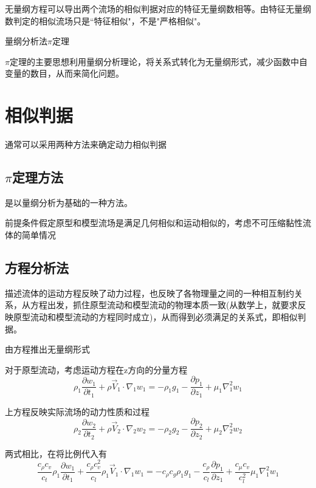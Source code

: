 \documentclass[a4paper,oneside]{ctexbook}
\begin{document}
无量纲方程可以导出两个流场的相似判据对应的特征无量纲数相等。由特征无量纲数判定的相似流场只是“特征相似"，不是"严格相似"。

量纲分析法\(\pi\)定理

\(\pi\)定理的主要思想利用量纲分析理论，将关系式转化为无量纲形式，减少函数中自变量的数目，从而来简化问题。

\section{相似判据}

通常可以采用两种方法来确定动力相似判据

\subsection{\(\pi\)定理方法}

是以量纲分析为基础的一种方法。

前提条件假定原型和模型流场是满足几何相似和运动相似的，考虑不可压缩黏性流体的简单情况

\subsection{方程分析法}

描述流体的运动方程反映了动力过程，也反映了各物理量之间的一种相互制约关系，从方程出发，抓住原型流动和模型流动的物理本质一致(从数学上，就要求反映原型流动和模型流动的方程同时成立)，从而得到必须满足的关系式，即相似判据。

由方程推出无量纲形式

对于原型流动，考虑运动方程在z方向的分量方程
\begin{equation}
    \rho_1\dfrac{\partial{w_1}}{\partial{t_1}}+\rho\overrightarrow{V}_1\cdot\nabla_1w_1=-\rho_1g_1-\dfrac{\partial{p_1}}{\partial{z_1}}+\mu_1\nabla_1^2w_1
\end{equation}

上方程反映实际流场的动力性质和过程
\begin{equation}
    \rho_2\dfrac{\partial{w_2}}{\partial{t_2}}+\rho\overrightarrow{V}_2\cdot\nabla_2w_2=-\rho_2g_2-\dfrac{\partial{p_2}}{\partial{z_2}}+\mu_2\nabla_2^2w_2
\end{equation}

两式相比，在将比例代入有
\begin{equation}
    \dfrac{c_\rho{}c_v}{c_t}\rho_1\dfrac{\partial{w_1}}{\partial{t_1}}+\dfrac{c_\rho{}c_v^2}{c_l}\rho_1\overrightarrow{V}_1\cdot\nabla_1w_1=-c_\rho{}c_g\rho_1g_1-\dfrac{c_\rho}{c_l}\dfrac{\partial{p_1}}{\partial{z_1}}+\dfrac{c_\mu{}c_v}{c_l^2}\mu_1\nabla_1^2w_1
\end{equation}
\end{document}
